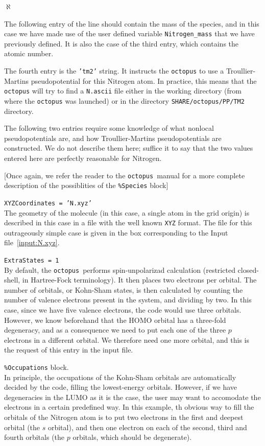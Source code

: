 \documentclass[10pt,a4paper,twoside]{article}
\newcommand{\octopus}{{\tt octopus}\ }
\newenvironment{mylist}
{
\begin{list}{$\aleph$}
{
\setlength{\parskip}{0pt}
\setlength{\topsep}{0pt}
\setlength{\partopsep}{0pt}
\setlength{\itemsep}{0pt}
\setlength{\parsep}{0pt}
}
}
{
\end{list}
}
\begin{document}
\begin{mylist}
The following entry of the line should contain the mass of the species, and in 
this case we have made use of the user defined variable {\tt Nitrogen\_mass} that
we have previously defined. It is also the case of the third entry, which contains
the atomic number.

The fourth entry is the {\tt 'tm2'} string. It instructs the {\tt octopus} to use
a Troullier-Martins pseudopotential for this Nitrogen atom. In practice, this means
that the {\tt octopus} will try to find a {\tt N.ascii} file either in the
working directory (from where the {\tt octopus} was launched) or in
the directory {\tt SHARE/octopus/PP/TM2} directory.

The following two entries require some knowledge of what nonlocal pseudopotentials
are, and how Troullier-Martins pseudopotentials are constructed. We do not describe them
here; suffice it to say that the two values entered here are perfectly reasonable for Nitrogen.

[Once again, we refer the reader to the \octopus manual for a more complete
description of the possiblities of the {\tt\%Species} block]

\item {\tt XYZCoordinates = 'N.xyz'}\\
The geometry of the molecule (in this case, a single atom in the grid origin) is
described in this case in a file with the well known {\tt XYZ} format.
The file for this outrageously simple case is given in the box corresponding to the
Input file~\ref{input:N.xyz}.

\item {\tt ExtraStates = 1}\\
By default, the \octopus performs spin-unpolarizad calculation (restricted closed-shell,
in Hartree-Fock terminology). It then places two electrons per orbital. The number
of orbitals, or Kohn-Sham states, is then calculated by counting the number of
valence electrons present in the system, and dividing by two. In this case, since we have five
valence electrons, the code would use three orbitals. However, we know beforehand
that the HOMO orbital has a three-fold degeneracy, and as a consequence we need to put
each one of the three $p$ electrons in a different orbital. We therefore need
one more orbital, and this is the request of this entry in the input file.

\item {\tt \%Occupations} block.\\
In principle, the occupations of the Kohn-Sham orbitals are automatically decided
by the code, filling the lowest-energy orbitals. However, if we have degeneracies
in the LUMO as it is the case, the user may want to accomodate the electrons
in a certain predefined way. In this example, th obvious way to fill the orbitals
of the Nitrogen atom is to put two electrons in the first and deepest orbital
(the $s$ orbital), and then one electron on each of the second, third and fourth
orbitals (the $p$ orbitals, which should be degenerate).


\end{mylist}
\end{document}
